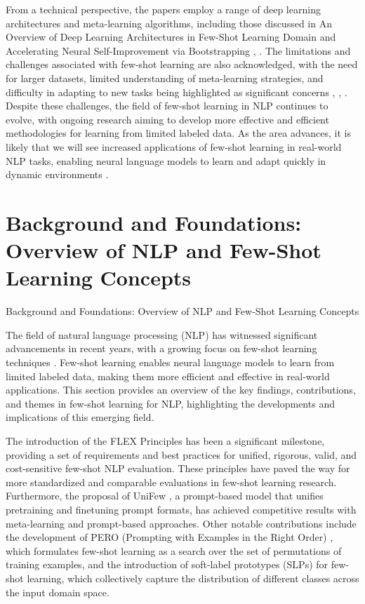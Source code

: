 \documentclass[conference]{IEEEtran}
\begin{document}
From a technical perspective, the papers employ a range of deep learning architectures and meta-learning algorithms, including those discussed in An Overview of Deep Learning Architectures in Few-Shot Learning Domain and Accelerating Neural Self-Improvement via Bootstrapping \cite{b4}, \cite{b5}. The limitations and challenges associated with few-shot learning are also acknowledged, with the need for larger datasets, limited understanding of meta-learning strategies, and difficulty in adapting to new tasks being highlighted as significant concerns \cite{b4}, \cite{b5}, \cite{b6}. Despite these challenges, the field of few-shot learning in NLP continues to evolve, with ongoing research aiming to develop more effective and efficient methodologies for learning from limited labeled data. As the area advances, it is likely that we will see increased applications of few-shot learning in real-world NLP tasks, enabling neural language models to learn and adapt quickly in dynamic environments \cite{b1}.

\section{Background and Foundations: Overview of NLP and Few-Shot Learning Concepts}
Background and Foundations: Overview of NLP and Few-Shot Learning Concepts

The field of natural language processing (NLP) has witnessed significant advancements in recent years, with a growing focus on few-shot learning techniques \cite{b1}. Few-shot learning enables neural language models to learn from limited labeled data, making them more efficient and effective in real-world applications. This section provides an overview of the key findings, contributions, and themes in few-shot learning for NLP, highlighting the developments and implications of this emerging field.

The introduction of the FLEX Principles \cite{b2} has been a significant milestone, providing a set of requirements and best practices for unified, rigorous, valid, and cost-sensitive few-shot NLP evaluation. These principles have paved the way for more standardized and comparable evaluations in few-shot learning research. Furthermore, the proposal of UniFew \cite{b2}, a prompt-based model that unifies pretraining and finetuning prompt formats, has achieved competitive results with meta-learning and prompt-based approaches. Other notable contributions include the development of PERO (Prompting with Examples in the Right Order) \cite{b3}, which formulates few-shot learning as a search over the set of permutations of training examples, and the introduction of soft-label prototypes (SLPs) \cite{b4} for few-shot learning, which collectively capture the distribution of different classes across the input domain space.
\end{document}
